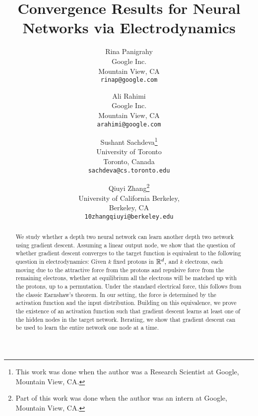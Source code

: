\documentclass[11pt]{article}
\title{
Convergence Results for Neural Networks
 via Electrodynamics
}
\author{
  Rina Panigrahy \\
  Google Inc. \\
  Mountain View, CA\\
  \texttt{rinap@google.com} \and
  Ali Rahimi \\
  Google Inc. \\
  Mountain View, CA\\
  \texttt{arahimi@google.com} \and
  Sushant Sachdeva\thanks{This work was done when the author was a Research Scientist at Google, Mountain View, CA.} \\
  University of Toronto \\
  Toronto, Canada\\
  \texttt{sachdeva@cs.toronto.edu} \and Qiuyi Zhang\thanks{Part of
    this work was done when the author was
    an intern at Google, Mountain View, CA.}  \\
  University of California Berkeley, \\
  Berkeley, CA \\
  \texttt{10zhangqiuyi@berkeley.edu} }
\begin{document}
 

\maketitle

\begin{abstract} 
We study whether a depth two neural network can learn another 
depth two network using gradient descent.
Assuming a linear output node,
we show that
the question of whether gradient descent converges to the 
target function is equivalent to the following question in
electrodynamics: 
Given $k$ fixed protons in $\mathbb R^d,$ and $k$ electrons,
each moving due to the attractive force from the protons and repulsive
force from the remaining electrons,
whether at equilibrium all the electrons will be matched up with
the protons, up to a permutation. 
Under the standard electrical
force, this follows from the classic Earnshaw's theorem. In our setting,
the force  is 
determined by the activation function and the
input distribution.  
Building on this equivalence, we prove the
existence of an activation function such that 
gradient descent learns
at least one of the
hidden nodes in the target network. 
Iterating, we show that gradient
descent can be used to learn the entire network one node at a time.
\end{abstract} 








\end{document}
